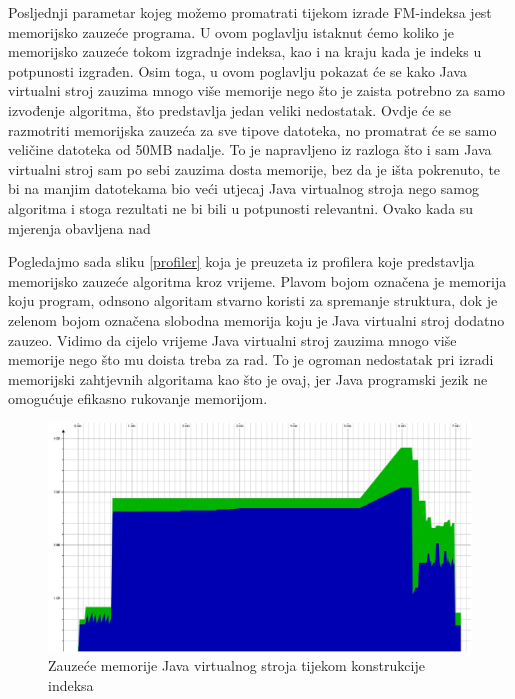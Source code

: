Posljednji parametar kojeg možemo promatrati tijekom izrade FM-indeksa jest memorijsko zauzeće programa. U ovom poglavlju istaknut ćemo koliko je memorijsko zauzeće tokom izgradnje indeksa, kao i na kraju kada je indeks u potpunosti izgrađen. Osim toga, u ovom poglavlju pokazat će se kako Java virtualni stroj zauzima mnogo više memorije nego što je zaista potrebno za samo izvođenje algoritma, što predstavlja jedan veliki nedostatak. Ovdje će se razmotriti memorijska zauzeća za sve tipove datoteka, no promatrat će se samo veličine datoteka od 50MB nadalje. To je napravljeno iz razloga što i sam Java virtualni stroj sam po sebi zauzima dosta memorije, bez da je išta pokrenuto, te bi na manjim datotekama bio veći utjecaj Java virtualnog stroja nego samog algoritma i stoga rezultati ne bi bili u potpunosti relevantni. Ovako kada su mjerenja obavljena nad 




Pogledajmo sada sliku \ref{profiler} koja je preuzeta iz profilera koje predstavlja memorijsko zauzeće algoritma kroz vrijeme. Plavom bojom označena je memorija koju program, odnsono algoritam stvarno koristi za spremanje struktura, dok je zelenom bojom označena slobodna memorija koju je Java virtualni stroj dodatno zauzeo. Vidimo da cijelo vrijeme Java virtualni stroj zauzima mnogo više memorije nego što mu doista treba za rad. To je ogroman nedostatak pri izradi memorijski zahtjevnih algoritama kao što je ovaj, jer Java programski jezik ne omogućuje efikasno rukovanje memorijom.

\begin{figure}[H]
   \centering
       \includegraphics[width=\linewidth]{./pictures/profiler.jpg}
 \caption{Zauzeće memorije Java virtualnog stroja tijekom konstrukcije indeksa}
 \label{fig:profiler}
\end{figure}